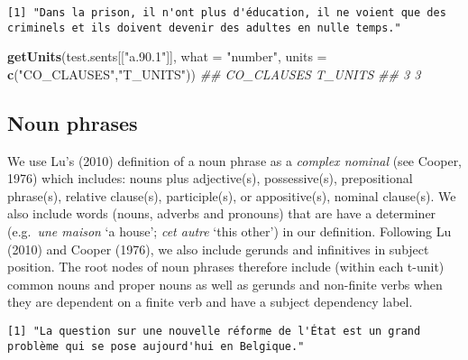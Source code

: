 \documentclass[
]{article}
\newenvironment{Shaded}{\begin{snugshade}}{\end{snugshade}}
\newcommand{\CommentTok}[1]{\textcolor[rgb]{0.56,0.35,0.01}{\textit{#1}}}
\newcommand{\DataTypeTok}[1]{\textcolor[rgb]{0.13,0.29,0.53}{#1}}
\newcommand{\KeywordTok}[1]{\textcolor[rgb]{0.13,0.29,0.53}{\textbf{#1}}}
\newcommand{\NormalTok}[1]{#1}
\newcommand{\StringTok}[1]{\textcolor[rgb]{0.31,0.60,0.02}{#1}}
\begin{document}
\begin{verbatim}
[1] "Dans la prison, il n'ont plus d'éducation, il ne voient que des criminels et ils doivent devenir des adultes en nulle temps."
\end{verbatim}

\begin{Shaded}
\begin{Highlighting}[]
\KeywordTok{getUnits}\NormalTok{(test.sents[[}\StringTok{"a.90.1"}\NormalTok{]], }
         \DataTypeTok{what =} \StringTok{"number"}\NormalTok{, }
         \DataTypeTok{units =} \KeywordTok{c}\NormalTok{(}\StringTok{"CO_CLAUSES"}\NormalTok{,}\StringTok{"T_UNITS"}\NormalTok{))}
\CommentTok{## CO_CLAUSES    T_UNITS }
\CommentTok{##          3          3}
\end{Highlighting}
\end{Shaded}

\hypertarget{noun-phrases}{%
\subsection{Noun phrases}\label{noun-phrases}}

We use Lu's (2010) definition of a noun phrase as a \emph{complex
nominal} (see Cooper, 1976) which includes: nouns plus adjective(s),
possessive(s), prepositional phrase(s), relative clause(s),
participle(s), or appositive(s), nominal clause(s). We also include
words (nouns, adverbs and pronouns) that are have a determiner
(e.g.~\emph{une maison} `a house'; \emph{cet autre} `this other') in our
definition. Following Lu (2010) and Cooper (1976), we also include
gerunds and infinitives in subject position. The root nodes of noun
phrases therefore include (within each t-unit) common nouns and proper
nouns as well as gerunds and non-finite verbs when they are dependent on
a finite verb and have a subject dependency label.

\begin{verbatim}
[1] "La question sur une nouvelle réforme de l'État est un grand problème qui se pose aujourd'hui en Belgique."
\end{verbatim}
\end{document}
